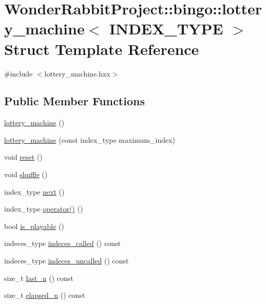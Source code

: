 \hypertarget{structWonderRabbitProject_1_1bingo_1_1lottery__machine}{\section{Wonder\-Rabbit\-Project\-:\-:bingo\-:\-:lottery\-\_\-machine$<$ I\-N\-D\-E\-X\-\_\-\-T\-Y\-P\-E $>$ Struct Template Reference}
\label{structWonderRabbitProject_1_1bingo_1_1lottery__machine}
}


{\ttfamily \#include $<$lottery\-\_\-machine.\-hxx$>$}

\subsection*{Public Member Functions}
\begin{DoxyCompactItemize}
\item 
\hyperlink{structWonderRabbitProject_1_1bingo_1_1lottery__machine_a9af0ae866e9c2832e26384de6969d895}{lottery\-\_\-machine} ()
\item 
\hyperlink{structWonderRabbitProject_1_1bingo_1_1lottery__machine_a0bc5bef50b36ead2ac5e1527558151a9}{lottery\-\_\-machine} (const index\-\_\-type maximum\-\_\-index)
\item 
void \hyperlink{structWonderRabbitProject_1_1bingo_1_1lottery__machine_adfdd8674398c8352a1d1542898befbce}{reset} ()
\item 
void \hyperlink{structWonderRabbitProject_1_1bingo_1_1lottery__machine_aa091af0e43ae1195968cec3d029dd6ae}{shuffle} ()
\item 
index\-\_\-type \hyperlink{structWonderRabbitProject_1_1bingo_1_1lottery__machine_afdabe377ba29064d346671ece2d2e57a}{next} ()
\item 
index\-\_\-type \hyperlink{structWonderRabbitProject_1_1bingo_1_1lottery__machine_ade94ee7680683f040670cb1abf25d1f6}{operator()} ()
\item 
bool \hyperlink{structWonderRabbitProject_1_1bingo_1_1lottery__machine_a15216377b16fbfc92d2be4972e568767}{is\-\_\-playable} ()
\item 
indeces\-\_\-type \hyperlink{structWonderRabbitProject_1_1bingo_1_1lottery__machine_a9af75b44815a75013fb5011862f1cde3}{indeces\-\_\-called} () const 
\item 
indeces\-\_\-type \hyperlink{structWonderRabbitProject_1_1bingo_1_1lottery__machine_a46bbbf2b96062774a9682a404262c2c2}{indeces\-\_\-uncalled} () const 
\item 
size\-\_\-t \hyperlink{structWonderRabbitProject_1_1bingo_1_1lottery__machine_acab6c57e2cf98c41b06cb1b4138dd09b}{last\-\_\-n} () const 
\item 
size\-\_\-t \hyperlink{structWonderRabbitProject_1_1bingo_1_1lottery__machine_ab80a574363fd96eb0f84022cfa5db59f}{elapsed\-\_\-n} () const 
\end{DoxyCompactItemize}
